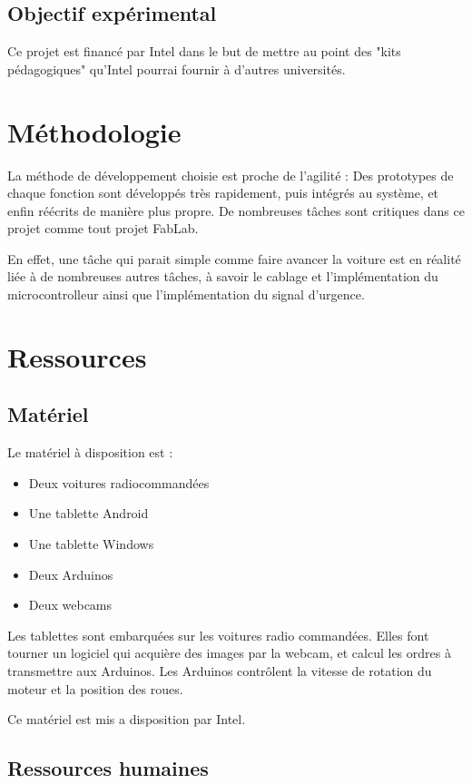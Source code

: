 \documentclass[a4paper,12pt]{article}
\begin{document}
\subsection{Objectif expérimental}

Ce projet est financé par Intel dans le but de mettre au point des "kits
pédagogiques" qu'Intel pourrai fournir à d'autres universités.

\section{Méthodologie}

La méthode de développement choisie est proche de l'agilité : Des prototypes de
chaque fonction sont développés très rapidement, puis intégrés au système, et
enfin réécrits de manière plus propre. De nombreuses tâches sont critiques
dans ce projet comme tout projet FabLab.

En effet, une tâche qui parait simple comme faire avancer la voiture est en
réalité liée à de nombreuses autres tâches, à savoir le cablage et
l'implémentation du microcontrolleur ainsi que l'implémentation du signal
d'urgence.

\section{Ressources}

\subsection{Matériel}

Le matériel à disposition est :
\begin{itemize}
    \item Deux voitures radiocommandées
    \item Une tablette Android
    \item Une tablette Windows
    \item Deux Arduinos
    \item Deux webcams
\end{itemize}

Les tablettes sont embarquées sur les voitures radio commandées. Elles font
tourner un logiciel qui acquière des images par la webcam, et calcul les ordres
à transmettre aux Arduinos. Les Arduinos contrôlent la vitesse de rotation du
moteur et la position des roues.

Ce matériel est mis a disposition par Intel.

\subsection{Ressources humaines}
\end{document}

